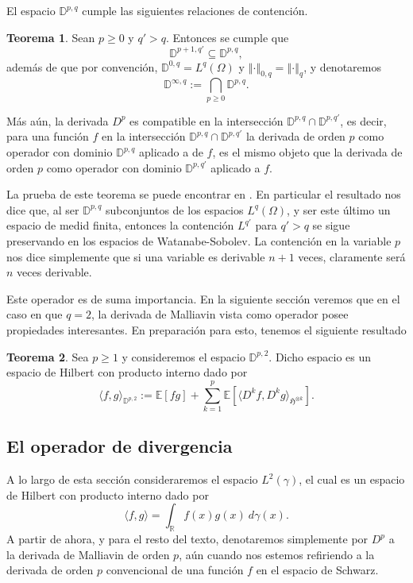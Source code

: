\documentclass[letterpaper,twoside,12pt]{book}
\newcommand{\R}{\mathbb{R}}
\newcommand{\D}{\mathbb{D}}
\newcommand{\E}{\mathbb{E}}
\newcommand{\1}{\mathds{1}}
\newcommand{\norm}[1]{\left\Vert #1 \right\Vert}
\theoremstyle{definition}
\theoremstyle{definition}
\newtheorem{teo}{Teorema}
\theoremstyle{remark}
\theoremstyle{definition}
\theoremstyle{definition}
\theoremstyle{definition}
\theoremstyle{definition}
\theoremstyle{definition}
\begin{document}
El espacio $\D^{p,q}$ cumple las siguientes relaciones de contención.

\begin{teo}\label{teocontencionessobolev}
Sean $p\geq0$ y $q'>q$. Entonces se cumple que 
\[
\D^{p+1,q'}\subseteq \D^{p,q},
\]
además de que por convención, $\D^{0,q}=L^{q}(\Omega)$ y $\norm{\cdot}_{0,q}=\norm{\cdot}_{q}$, y denotaremos 
\[
\D^{\infty,q}:=\bigcap_{p\geq0} \D^{p,q}.
\]

Más aún, la derivada $D^{p}$ es compatible en la intersección $\D^{p,q}\cap \D^{p,q'}$, es decir, para una función $f$ en la intersección $\D^{p,q}\cap \D^{p,q'}$ la derivada de orden $p$ como operador con dominio $\D^{p,q}$ aplicado a de $f$, es el mismo objeto que la derivada de orden $p$ como operador con dominio $\D^{p,q'}$ aplicado a $f$.
\end{teo}
La prueba de este teorema se puede encontrar en \cite[p. 27]{nualart2006malliavin}. En particular el resultado nos dice que, al ser $\D^{p,q}$ subconjuntos de los espacios $L^{q}(\Omega)$, y ser este último un espacio de medid finita, entonces la contención $L^{q'}$ para $q'>q$ se sigue preservando en los espacios de Watanabe-Sobolev. La contención en la variable $p$ nos dice simplemente que si una variable es derivable $n+1$ veces, claramente será $n$ veces derivable.

Este operador es de suma importancia. En la siguiente sección veremos que en el caso en que $q=2$, la derivada de Malliavin vista como operador posee propiedades interesantes. En preparación para esto, tenemos el siguiente resultado
\begin{teo} 
 Sea $p\geq1$ y consideremos el espacio $\D^{p,2}$. Dicho espacio es un espacio de Hilbert con producto interno dado por 
 \[
 \langle f,g\rangle_{\D^{p,2}}:=\E\left[fg\right]+\sum_{k=1}^{p}\E\left[\langle D^{k}f,D^{k}g\rangle_{\mathfrak{H}^{\otimes k}}\right].
 \]
 \end{teo}

\subsection{El operador de divergencia}

A lo largo de esta sección consideraremos el espacio $L^2(\gamma)$, el cual es un espacio de Hilbert con producto interno dado por 
\[
\langle f,g\rangle=\int_\R f(x)g(x)\ d\gamma(x).
\]
A partir de ahora, y para el resto del texto, denotaremos simplemente por $D^{p}$ a la derivada de Malliavin de orden $p$, aún cuando nos estemos refiriendo a la derivada de orden $p$ convencional de una función $f$ en el espacio de Schwarz.
\end{document}
